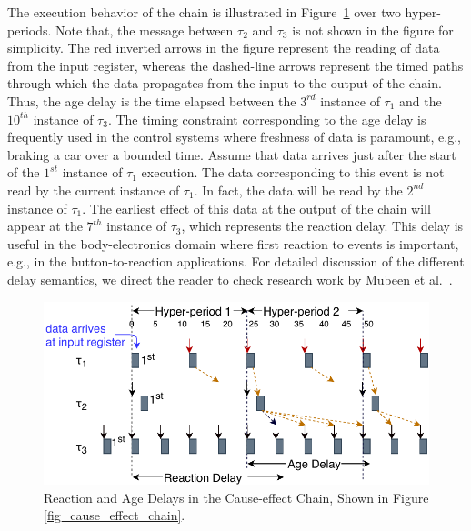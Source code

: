 The execution behavior of the chain is illustrated in Figure~\ref{fig_timedchainntk} over two hyper-periods.  Note that, the message between $\tau_2$ and $\tau_3$ is not shown in the figure for simplicity. The red inverted arrows in the figure represent the reading of data from the input register, whereas the dashed-line arrows represent the timed paths through which the data propagates from the input to the output of the chain. Thus, the age delay is the time elapsed between the $3^{rd}$ instance of  $\tau_1$  and the $10^{th}$ instance of $\tau_3$. The timing constraint corresponding to the age delay is frequently used in the control systems where freshness of data is paramount, e.g., braking a car over a bounded time. Assume that data arrives just after the start of the $1^{st}$ instance of $\tau_1$ execution. The data corresponding to this event is not read by the current instance of $\tau_1$. In fact, the data will be read by the $2^{nd}$ instance of $\tau_1$. The earliest effect of this data at the output of the chain will appear at the $7^{th}$ instance of $\tau_3$, which represents the reaction delay. This delay is useful in the body-electronics domain where first reaction to events is important, e.g., in the button-to-reaction applications. For detailed discussion of the different delay semantics, we direct the reader to check research work by Mubeen et al.~\cite{Mubeen2019SupportingConstraints}. 
\begin{figure}[h]
	\centering
	\includegraphics[width=0.8\linewidth]{img/timedchain_ntk}
	\caption{Reaction and Age Delays in the Cause-effect Chain, Shown in Figure {\ref{fig_cause_effect_chain}}.}
	\label{fig_timedchainntk}
\end{figure}

